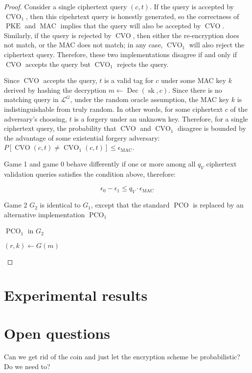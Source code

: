 \documentclass{article}
\newcommand{\pke}{\operatorname{PKE}}
\newcommand{\enc}{\operatorname{Enc}}
\newcommand{\dec}{\operatorname{Dec}}
\newcommand{\mac}{\operatorname{MAC}}
\newcommand{\cvo}{\operatorname{CVO}}
\newcommand{\pco}{\operatorname{PCO}}
\newcommand{\llbrack}{[\![}
\newcommand{\rrbrack}{]\!]}
\begin{document}
\begin{proof}
    Consider a single ciphertext query $(c, t)$. If the query is accepted by $\cvo_1$, then this cipehrtext query is honestly generated, so the correctness of $\pke$ and $\mac$ implies that the query will also be accepted by $\cvo$. Similarly, if the query is rejected by $\cvo$, then either the re-encryption does not match, or the MAC does not match; in any case, $\cvo_1$ will also reject the ciphertext query. Therefore, these two implementations disagree if and only if $\cvo$ accepts the query but $\cvo_1$ rejects the query.

    Since $\cvo$ accepts the query, $t$ is a valid tag for $c$ under some MAC key $k$ derived by hashing the decryption $m \leftarrow \dec(\operatorname{sk}, c)$. Since there is no matching query in $\mathcal{L}^G$, under the random oracle assumption, the MAC key $k$ is indistinguishable from truly random. In other words, for some ciphertext $c$ of the adversary's choosing, $t$ is a forgery under an unknown key. Therefore, for a single ciphertext query, the probability that $\cvo$ and $\cvo_1$ disagree is bounded by the advantage of some existential forgery adversary: $P[\cvo(c, t) \neq \cvo_1(c, t)] \leq \epsilon_{\mac}$.

    Game 1 and game 0 behave differently if one or more among all $q_V$ ciphertext validation queries satisfies the condition above, therefore:

    \begin{equation*}
        \epsilon_0 - \epsilon_1 \leq q_V \cdot \epsilon_{\mac}
    \end{equation*}

    Game 2 $G_2$ is identical to $G_1$, except that the standard $\pco$ is replaced by an alternative implementation $\pco_1$

    \begin{algorithm}[H]
        \SetAlgoLined
        \caption{$\pco_1$ in $G_2$}
        $(r, k) \leftarrow G(m)$\;
        \Return{
            $\llbrack \enc(\operatorname{pk}, m; r) = c \rrbrack$
            and $\llbrack \mac(k, c) = t \rrbrack$
        }
    \end{algorithm}

\end{proof}

\section{Experimental results}

\section{Open questions}
Can we get rid of the coin and just let the encryption scheme be probabilistic? Do we need to?
\end{document}
